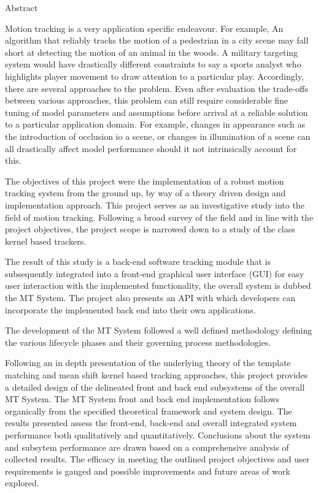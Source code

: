 \begin{centerpage}{Abstract}
 
Motion tracking is a very application specific endeavour. For example, An
algorithm that reliably tracks the motion of a pedestrian in a city scene may fall
short at detecting the motion of an animal in the woods. A military targeting
system would have drastically different constraints to say a sports analyst
who highlights player movement to draw attention to a particular play.
Accordingly, there are several approaches to the problem. Even after evaluation
the trade-offs between various approaches, this problem can still require
considerable fine tuning of model parameters and assumptions before arrival at a
reliable solution to a particular application domain. 
For example, changes in appearance such as the introduction of occlusion io a scene, or changes in
illumination of a scene can all drastically affect model performance should it
not intrinsically account for this.

The objectives of this project were the implementation of a robust motion
tracking system from the ground up, by way of a theory driven design and
implementation approach. 
This project serves as an investigative study into the field of motion tracking.
Following a broad survey of the field and in line with the project objectives,
the project scope is narrowed down to a study of the class kernel based
trackers.
    
The result of this study is a back-end software tracking module that
is subsequently integrated into a front-end graphical user interface (GUI) for easy
user interaction with the implemented functionality, the overall system is
dubbed the MT System. 
The project also presents an API with which developers can incorporate the
implemented back end into their own applications.

The development of the MT System followed a well defined methodology defining the various
lifecycle phases and their governing process methodologies. 

Following an in depth presentation of the underlying theory of the template matching
and mean shift kernel based tracking approaches, this project provides a
detailed design of the delineated front and back end subsystems of the
overall MT System. 
The MT System front and back end implementation follows organically from the
specified theoretical framework and system design. The results presented assess
the front-end, back-end and overall integrated system performance both qualitatively and
quantitatively. Conclusions about the system and subsytem performance are drawn based on a comprehensive
analysis of collected results. The efficacy in meeting the outlined project
objectives and user requirements is gauged and possible improvements and
future areas of work explored.




\end{centerpage}
